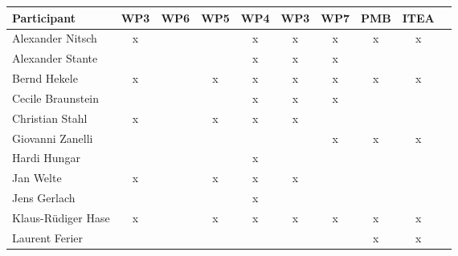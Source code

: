 \documentclass[a4paper, 11pt]{article}
\begin{document}
\begin{tabular}{|l|c|c|c||c|c|c||c|c|c|}
\hline
\textbf{Participant} &  \textbf{WP3} & \textbf{WP6} &  \textbf{WP5} & \textbf{WP4}&  \textbf{WP3} & \textbf{WP7}&  \textbf{PMB} & \textbf{ITEA} \\\hline
Alexander Nitsch      & x &   &   & x & x & x & x & x \\\hline  
Alexander Stante      &   &   &   & x & x & x &   &   \\\hline 
Bernd Hekele          & x &   & x & x & x & x & x & x \\\hline
Cecile Braunstein     &   &   &   & x & x & x &   &   \\\hline
Christian Stahl       & x &   & x & x & x &   &   &   \\\hline
Giovanni Zanelli      &   &   &   &   &   & x & x & x \\\hline
Hardi Hungar          &   &   &   & x &   &   &   &   \\\hline
Jan Welte             & x &   & x & x & x &   &   &   \\\hline
Jens Gerlach          &   &   &   & x &   &   &   &   \\\hline
Klaus-R\"udiger Hase  & x &   & x & x & x & x & x & x \\\hline
Laurent Ferier        &   &   &   &   &   &   & x & x \\\hline

\end{tabular}
\end{document}
